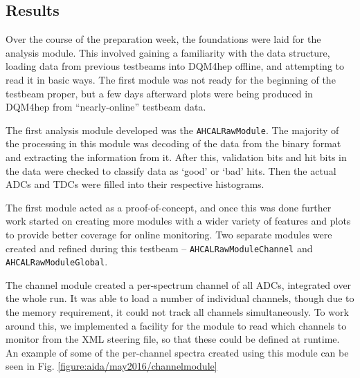 \subsection{Results}
Over the course of the preparation week, the foundations were laid for the analysis module. This involved gaining a familiarity with the data structure, loading data from previous testbeams into \acrshort{DQM4hep} offline, and attempting to read it in basic ways. The first module was not ready for the beginning of the testbeam proper, but a few days afterward plots were being produced in \acrshort{DQM4hep} from ``nearly-online'' testbeam data.

The first analysis module developed was the \texttt{AHCALRawModule}. The majority of the processing in this module was decoding of the data from the binary format and extracting the information from it. After this, validation bits and hit bits in the data were checked to classify data as `good' or `bad' hits. Then the actual \acrshort{ADC}s and \acrshort{TDC}s were filled into their respective histograms. 

The first module acted as a proof-of-concept, and once this was done further work started on creating more modules with a wider variety of features and plots to provide better coverage for online monitoring. Two separate modules were created and refined during this testbeam -- \texttt{AHCALRawModuleChannel} and \texttt{AHCALRawModuleGlobal}. 

The channel module created a per-spectrum channel of all \acrshort{ADC}s, integrated over the whole run. It was able to load a number of individual channels, though due to the memory requirement, it could not track all channels simultaneously. To work around this, we implemented a facility for the module to read which channels to monitor from the \acrshort{XML} steering file, so that these could be defined at runtime. An example of some of the per-channel spectra created using this module can be seen in Fig. \ref{figure:aida/may2016/channelmodule}

